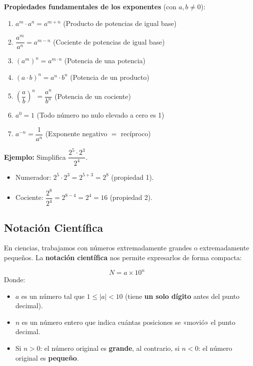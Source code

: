 \documentclass[12pt, letterpaper]{article}
\begin{document}
\begin{cuadroteoria}
  \textbf{Propiedades fundamentales de los exponentes} (con $a, b \neq 0$):
  \begin{enumerate}[leftmargin=*, label=\arabic*.]
    \item $a^m \cdot a^n = a^{m+n}$ \hfill (Producto de potencias de igual base)
    \item $\dfrac{a^m}{a^n} = a^{m-n}$ \hfill (Cociente de potencias de igual base)
    \item $(a^m)^n = a^{m \cdot n}$ \hfill (Potencia de una potencia)
    \item $(a \cdot b)^n = a^n \cdot b^n$ \hfill (Potencia de un producto)
    \item $\left(\dfrac{a}{b}\right)^n = \dfrac{a^n}{b^n}$ \hfill (Potencia de un cociente)
    \item $a^0 = 1$ \hfill (Todo número no nulo elevado a cero es 1)
    \item $a^{-n} = \dfrac{1}{a^n}$ \hfill (Exponente negativo $=$ recíproco)
  \end{enumerate}
\end{cuadroteoria}

\noindent\textbf{Ejemplo:} Simplifica $\dfrac{2^5 \cdot 2^3}{2^4}$.
\begin{itemize}
  \item Numerador: $2^5 \cdot 2^3 = 2^{5+3} = 2^8$ (propiedad 1).
  \item Cociente: $\dfrac{2^8}{2^4} = 2^{8-4} = 2^4 = 16$ (propiedad 2).
\end{itemize}

\subsection{Notación Científica}

En ciencias, trabajamos con números extremadamente grandes o extremadamente pequeños. La \textbf{notación científica} nos permite expresarlos de forma compacta:
\newpage
\begin{cuadrosolucion}
  $$N = a \times 10^n$$
  Donde:
  \begin{itemize}[leftmargin=*]
    \item $a$ es un número tal que $1 \leq |a| < 10$ (tiene \textbf{un solo dígito} antes del punto decimal).
    \item $n$ es un número entero que indica cuántas posiciones se «movió» el punto decimal.
    \item Si $n > 0$: el número original es \textbf{grande}, al contrario, si $n < 0$: el número original es \textbf{pequeño}.
  \end{itemize}
\end{cuadrosolucion}
\end{document}
